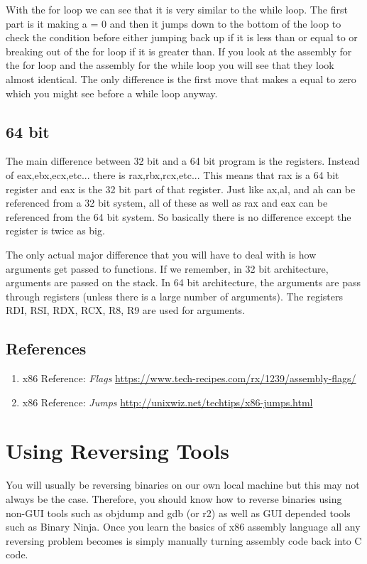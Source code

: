 \documentclass{report}
\begin{document}
With the for loop we can see that it is very similar to the while loop.  The first part is it making
a = 0 and then it jumps down to the bottom of the loop to check the condition before either jumping
back up if it is less than or equal to or breaking out of the for loop if it is greater than.  If 
you look at the assembly for the for loop and the assembly for the while loop you will see that 
they look almost identical.  The only difference is the first move that makes a equal to zero
which you might see before a while loop anyway.

\section{64 bit}
The main difference between 32 bit and a 64 bit program is the registers.  Instead of
eax,ebx,ecx,etc...  there is rax,rbx,rcx,etc...  This means that rax is a 64 bit register 
and eax is the 32 bit part of that register.  Just like ax,al, and ah can be referenced from a
32 bit system, all of these as well as rax and eax can be referenced from the 64 bit system.
So basically there is no difference except the register is twice as big.

The only actual major difference that you will have to deal with is how arguments get passed to
functions.  If we remember, in 32 bit architecture, arguments are passed on the stack.  In 
64 bit architecture, the arguments are pass through registers (unless there is a large number of 
arguments).  The registers RDI, RSI, RDX, RCX, R8, R9 are used for arguments.

\vspace{1cm}
\section{References}
\label{ref:2}
\begin{enumerate}[label=(\alph*)]
\item x86 Reference: \textit{Flags} \url{https://www.tech-recipes.com/rx/1239/assembly-flags/}
\item x86 Reference: \textit{Jumps} \url{http://unixwiz.net/techtips/x86-jumps.html}


\end{enumerate}



\chapter{Using Reversing Tools}
You will usually be reversing binaries on our own local machine but this may not always be the case.  Therefore, you should know how to reverse binaries using non-GUI tools such as objdump and gdb (or r2) as well as GUI depended tools such as Binary Ninja.  Once you learn the basics of x86 assembly language all any reversing problem becomes is simply manually turning assembly code back into C code.  
\end{document}
